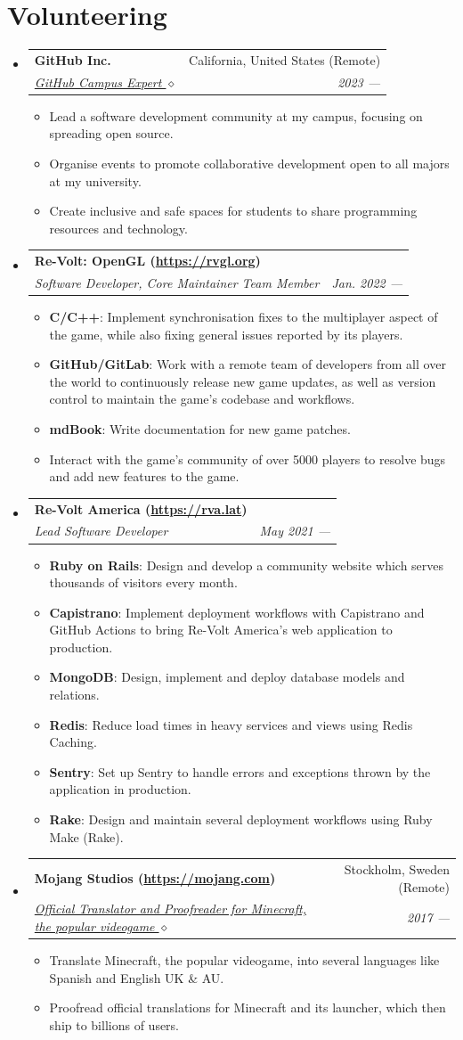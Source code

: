 \documentclass[letterpaper,11pt]{article}
\makeatletter
\newcommand{\resumeItem}[2]{
	\item\small{
		\textbf{#1}{: #2 \vspace{-2pt}}
	}
}
\newcommand{\resumeSubheading}[4]{
	\vspace{-1pt}\item
	\begin{tabular*}{0.97\textwidth}[t]{l@{\extracolsep{\fill}}r}
		\textbf{#1} & #2 \\
		\textit{\small#3} & \textit{\small #4} \\
	\end{tabular*}\vspace{-5pt}
}
\newcommand{\resumeSubHeadingListStart}{\begin{itemize}[leftmargin=*]}
\newcommand{\resumeSubHeadingListEnd}{\end{itemize}}
\newcommand{\resumeItemListStart}{\begin{itemize}}
\newcommand{\resumeItemListEnd}{\end{itemize}\vspace{-5pt}}
\makeatother
\begin{document}
	\section{Volunteering}
	\resumeSubHeadingListStart
	\resumeSubheading
	{GitHub Inc.}{California, United States (Remote)}
	{\href{https://githubcampus.expert/BGMP}{GitHub Campus Expert $\diamond$}}{2023 ---}
	\resumeItemListStart
	\item{Lead a software development community at my campus, focusing on spreading open source.}
	\item{Organise events to promote collaborative development open to all majors at my university.}
	\item{Create inclusive and safe spaces for students to share programming resources and technology.}
	\resumeItemListEnd
	\resumeSubheading
	{Re-Volt: OpenGL (\textnormal{\url{https://rvgl.org}})}{}
	{Software Developer, Core Maintainer Team Member}{Jan. 2022 ---}
	\resumeItemListStart
	\resumeItem{C/C++}{Implement synchronisation fixes to the multiplayer aspect of the game, while also fixing general issues reported by its players.}
	\resumeItem{GitHub/GitLab}{Work with a remote team of developers from all over the world to continuously release new game updates, as well as version control to maintain the game's codebase and workflows.}
	\resumeItem{mdBook}{Write documentation for new game patches.}
	\item{Interact with the game's community of over 5000 players to resolve bugs and add new features to the game.}
	\resumeItemListEnd
	\resumeSubheading
	{Re-Volt America (\textnormal{\url{https://rva.lat}})}{}
	{Lead Software Developer}{May 2021 ---}
	\resumeItemListStart
	\resumeItem{Ruby on Rails}{Design and develop a community website which serves thousands of visitors every month.}
	\resumeItem{Capistrano}{Implement deployment workflows with Capistrano and GitHub Actions to bring Re-Volt America's web application to production.}
	\resumeItem{MongoDB}{Design, implement and deploy database models and relations.}
	\resumeItem{Redis}{Reduce load times in heavy services and views using Redis Caching.}
	\resumeItem{Sentry}{Set up Sentry to handle errors and exceptions thrown by the application in production.}
	\resumeItem{Rake}{Design and maintain several deployment workflows using Ruby Make (Rake).}
	\resumeItemListEnd
	\resumeSubheading
	{Mojang Studios (\textnormal{\url{https://mojang.com}})}{Stockholm, Sweden (Remote)}
	{\href{https://crowdin.com/profile/bgm}{Official Translator and Proofreader for Minecraft, the popular videogame $\diamond$}}{2017 ---}
	\resumeItemListStart
	\item{Translate Minecraft, the popular videogame, into several languages like Spanish and English UK \& AU.}
	\item{Proofread official translations for Minecraft and its launcher, which then ship to billions of users.}
	\resumeItemListEnd
	\resumeSubHeadingListEnd
	
\end{document}
